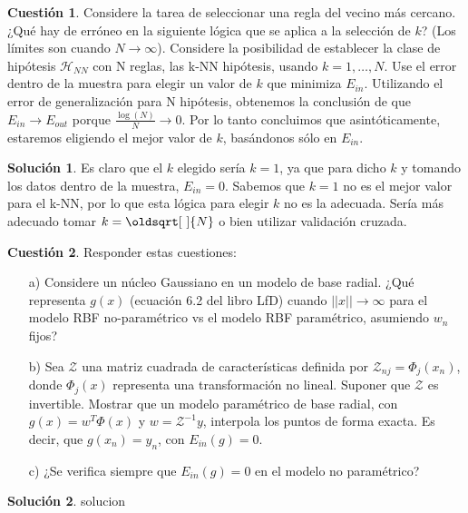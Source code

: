 \documentclass[a4paper, 11pt]{article}
\theoremstyle{definition}
\newtheorem{cuestion}{Cuestión}
\newtheorem*{solucion}{Solución}
\renewcommand*{\sqrt}[2][\ ]{\oldsqrt[#1]{#2} }
\begin{document}
  \begin{cuestion}
    Considere la tarea de seleccionar una regla del vecino más cercano. ¿Qué hay de erróneo en la siguiente lógica que se aplica a la selección de $k$? (Los límites son cuando $N \rightarrow \infty$).
    Considere la posibilidad de establecer la clase de hipótesis $\mathcal{H}_{NN}$ con N reglas, las k-NN hipótesis, usando $k=1,\ldots,N$. Use el error dentro de la muestra para elegir un valor de $k$ que minimiza $E_{in}$. Utilizando el error de generalización para N hipótesis, obtenemos la conclusión de que $E_{in} \rightarrow E_{out}$ porque $\frac{\log(N)}{N} \rightarrow 0$. Por lo tanto concluimos que asintóticamente, estaremos eligiendo el mejor valor de $k$, basándonos sólo en $E_{in}$.
  \end{cuestion}

  \begin{solucion}
    Es claro que el $k$ elegido sería $k=1$, ya que para dicho $k$ y tomando los datos dentro de la muestra, $E_{in}=0$. Sabemos que $k=1$ no es el mejor valor para el k-NN, por lo que esta lógica para elegir $k$ no es la adecuada. Sería más adecuado tomar $k=\sqrt{N}$ o bien utilizar validación cruzada.
  \end{solucion}

  \begin{cuestion}
    Responder estas cuestiones:
    \begin{enumerate}
      \item[a)] Considere un núcleo Gaussiano en un modelo de base radial. ¿Qué representa $g(x)$ (ecuación 6.2 del libro LfD) cuando $||x|| \rightarrow \infty$ para el modelo RBF no-paramétrico vs el modelo RBF paramétrico, asumiendo $w_n$ fijos?
      \item[b)] Sea $\mathcal{Z}$ una matriz cuadrada de características definida por $\mathcal{Z}_{nj}=\Phi_j(x_n)$, donde $\Phi_j(x)$ representa una transformación no lineal. Suponer que $\mathcal{Z}$ es invertible. Mostrar que un modelo paramétrico de base radial, con $g(x) = w^T\Phi(x)$ y $ w = \mathcal{Z}^{-1}y $, interpola los puntos de forma exacta. Es decir, que $g(x_n) = y_n$, con $E_{in}(g) = 0$.
      \item[c)] ¿Se verifica siempre que $E_{in}(g) = 0$ en el modelo no paramétrico?
    \end{enumerate}
  \end{cuestion}

  \begin{solucion}
    solucion
  \end{solucion}
\end{document}
